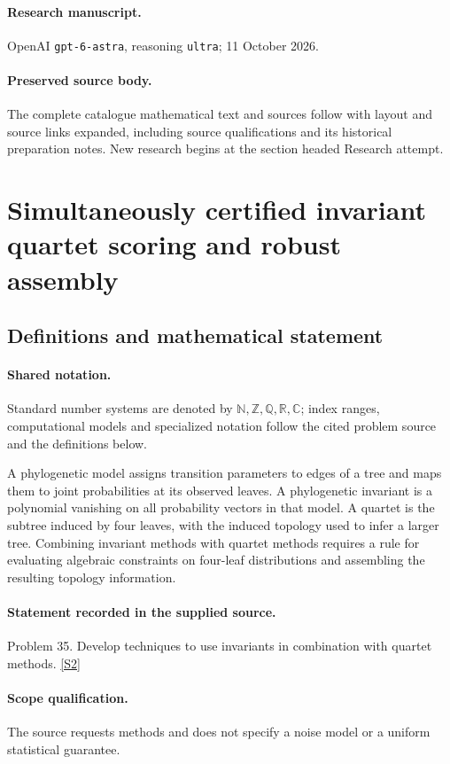\documentclass[11pt]{article}
\begin{document}
\paragraph{Research manuscript.} OpenAI \texttt{gpt-6-astra}, reasoning \texttt{ultra}; 11 October 2026.
\paragraph{Preserved source body.} The complete catalogue mathematical text and sources follow with layout and source links expanded, including source qualifications and its historical preparation notes. New research begins at the section headed Research attempt.

\section{Simultaneously certified invariant quartet scoring and robust assembly}\label{statement}

\subsection{Definitions and mathematical statement}

\paragraph{Shared notation.}Standard number systems are denoted by $\mathbb N,\mathbb Z,\mathbb Q,\mathbb R,\mathbb C$; index ranges, computational models and specialized notation follow the cited problem source and the definitions below.


A phylogenetic model assigns transition parameters to edges of a tree and maps them to joint probabilities at its observed leaves. A phylogenetic invariant is a polynomial vanishing on all probability vectors in that model. A quartet is the subtree induced by four leaves, with the induced topology used to infer a larger tree. Combining invariant methods with quartet methods requires a rule for evaluating algebraic constraints on four-leaf distributions and assembling the resulting topology information.
\paragraph{Statement recorded in the supplied source.}
Problem 35. Develop techniques to use invariants in combination with quartet methods. \href{https://aimath.org/WWN/compalgstat/compalgstat.pdf}{[S2]}
\paragraph{Scope qualification.}
The source requests methods and does not specify a noise model or a uniform statistical guarantee.
\end{document}
